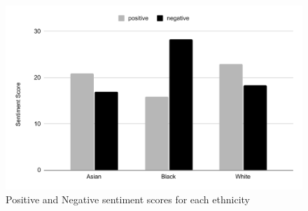 \documentclass[11pt]{article}
\begin{document}
\begin{figure}
    \centering
    \includegraphics[width=0.7\linewidth]{chart.pdf}
    \caption{Positive and Negative sentiment scores for each ethnicity }
    \label{fig:race_sentiment}
\end{figure}




\end{document}
